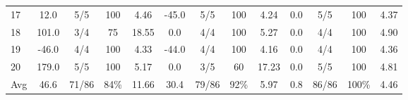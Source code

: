 \begin{table}[p]
{\begin{tabular}{l|cccc|cccc|cccc}
17 & 12.0 & 5/5 & 100 & 4.46 & -45.0 & 5/5 & 100 & 4.24 & 0.0 & 5/5 & 100 & 4.37 \\
18 & 101.0 & 3/4 & 75 & 18.55 & 0.0 & 4/4 & 100 & 5.27 & 0.0 & 4/4 & 100 & 4.90 \\
19 & -46.0 & 4/4 & 100 & 4.33 & -44.0 & 4/4 & 100 & 4.16 & 0.0 & 4/4 & 100 & 4.36 \\
20 & 179.0 & 5/5 & 100 & 5.17 & 0.0 & 3/5 & 60 & 17.23 & 0.0 & 5/5 & 100 & 4.81 \\
\midrule
Avg & 46.6 & 71/86 & 84\% & 11.66 & 30.4 & 79/86 & 92\% & 5.97 & 0.8 & 86/86 & 100\% & 4.46 \\
\bottomrule
\end{tabular}%
}
\end{table}
